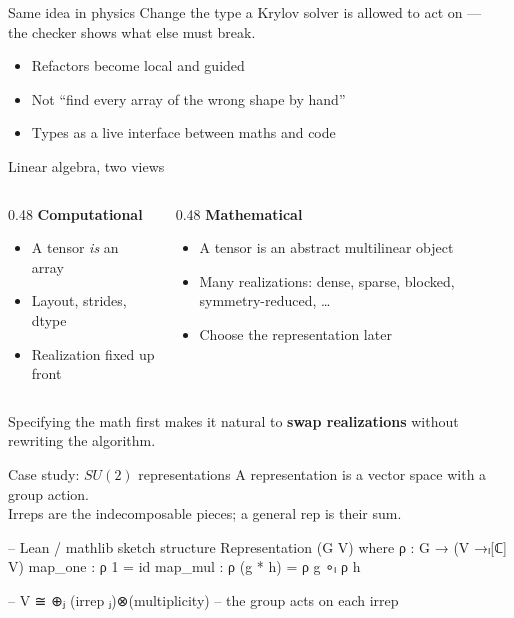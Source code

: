 \begin{frame}{Same idea in physics}
  Change the type a Krylov solver is allowed to act on ---\\
  the checker shows what else must break.

  \vspace{0.9em}
  \begin{itemize}\setlength\itemsep{0.4em}
    \item Refactors become local and guided
    \item Not ``find every array of the wrong shape by hand''
    \item Types as a live interface between maths and code
  \end{itemize}
\end{frame}

\begin{frame}{Linear algebra, two views}
  \begin{columns}[T]
    \begin{column}{0.48\textwidth}
      \textbf{Computational}
      \begin{itemize}\setlength\itemsep{0.35em}
        \item A tensor \emph{is} an array
        \item Layout, strides, dtype
        \item Realization fixed up front
      \end{itemize}
    \end{column}
    \begin{column}{0.48\textwidth}
      \textbf{Mathematical}
      \begin{itemize}\setlength\itemsep{0.35em}
        \item A tensor is an abstract
          multilinear object
        \item Many realizations:
          dense, sparse, blocked,
          symmetry-reduced, \ldots
        \item Choose the representation
          later
      \end{itemize}
    \end{column}
  \end{columns}
  \vspace{1em}
  Specifying the math first makes it natural to
  \textbf{swap realizations} without rewriting the algorithm.
\end{frame}

\begin{frame}[fragile]{Case study: $SU(2)$ representations}
  A representation is a vector space with a group action.\\
  Irreps are the indecomposable pieces; a general rep is their sum.
  \vspace{0.45em}
\begin{semiverbatim}
-- Lean / mathlib sketch
structure Representation (G V) where
  ρ : G → (V →ₗ[ℂ] V)
  map_one : ρ 1 = id
  map_mul : ρ (g * h) = ρ g ∘ₗ ρ h

-- V ≅ ⊕ⱼ  (irrep ⱼ)⊗(multiplicity)
-- the group acts on each irrep
\end{semiverbatim}
\end{frame}

